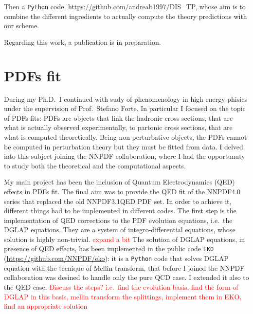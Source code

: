 \documentclass[11pt,a4paper]{moderncv}        %
\begin{document}
Then a \texttt{Python} code, \url{https://github.com/andreab1997/DIS_TP}, whose aim is to combine the different ingredients to actually
compute the theory predictions with our scheme.

Regarding this work, a publication is in preparation.


\section{PDFs fit}

During my Ph.D.\ I continued with sudy of phenomenology in high energy phisics under the supervision of Prof.\ Stefano Forte.
In particular I focused on the topic of PDFs fits: PDFs are objects that link the hadronic cross sections, that are what is actually observed
experimentally, to partonic cross sections, that are what is computed theoretically.
Being non-perturbative objects, the PDFs cannot be computed in perturbation theory but they must be fitted from data.
I delved into this subject joining the NNPDF collaboration, where I had the opportunuty to study both the theoretical and the
computational aspects.

My main project has been the inclusion of Quantum Electrodynamics (QED) effects in PDFs fit.
The final aim was to provide the QED fit of the NNPDF4.0 series that replaced the old NNPDF3.1QED PDF set.
In order to achieve it, different things had to be implemented in different codes.
The first step is the implementation of QED corrections to the PDF evolution equations, i.e.\ the DGLAP equations.
They are a system of integro-differential equations, whose solution is highly non-trivial. \textcolor{red}{expand a bit}
The solution of DGLAP equations, in presence of QED effects, has been implemented in the public code \texttt{EKO} (\url{https://github.com/NNPDF/eko}):
it is a \texttt{Python} code that solves DGLAP equation with the tecnique of Mellin transform, that before I joined the NNPDF collaboration
was desined to handle only the pure QCD case.
I extended it also to the QED case. \textcolor{red}{Discuss the steps? i.e.\ find the evolution basis, find the form of DGLAP in this basis,
mellin transform the splittings, implement them in EKO, find an appropriate solution}
\end{document}
